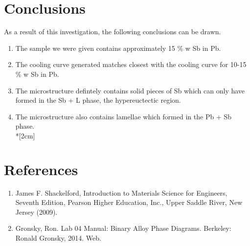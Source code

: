 \documentclass{article}
\begin{document}
\section{Conclusions}
As a result of this investigation, the following conclusions can be drawn.
\begin{enumerate}
\item The sample we were given contains approximately 15 \% w Sb in Pb.
\item The cooling curve generated matches closest with the cooling curve for 10-15 \% w Sb in Pb.
\item The microstructure defintely contains solid pieces of Sb which can only have formed in the Sb + L phase, the hypereuctectic region.
\item The microstructure also contains lamellae which formed in the Pb + Sb phase. \\*[2cm]
\end{enumerate}


\section{References}
\begin{enumerate}
\item James F. Shackelford, Introduction to Materials Science for Engineers, Seventh Edition, Pearson Higher 
Education, Inc., Upper Saddle River, New Jersey (2009).
\item Gronsky, Ron. Lab 04 Manual: Binary Alloy Phase Diagrams. Berkeley: Ronald Gronsky, 2014. Web.
\end{enumerate}








\end{document}
